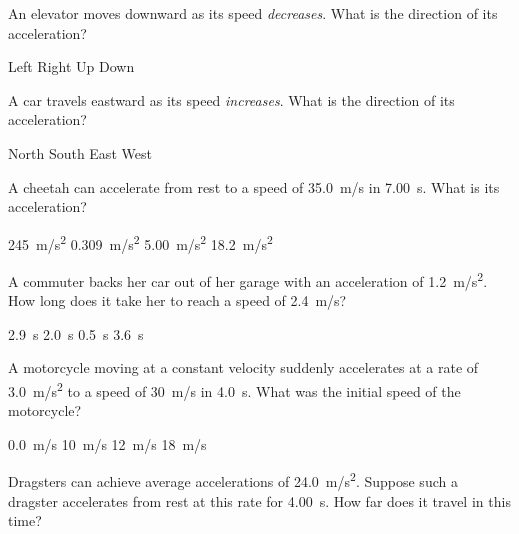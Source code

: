 \documentclass[]{exam}
\theoremstyle{definition}
\begin{document}
\begin{questions}
\question %
An elevator moves downward as its speed \textit{decreases}. What is the direction of its acceleration?

\begin{choices}
\choice Left
\choice Right 
\correctchoice Up
\choice Down
\end{choices}

\question %
A car travels eastward as its speed \textit{increases}. What is the direction of its acceleration?

\begin{choices}
\choice North
\choice South 
\correctchoice East
\choice West
\end{choices}


\question %
A cheetah can accelerate from rest to a speed of \SI{35.0}{m/s} in \SI{7.00}{s}. What is its acceleration?

\begin{choices}
\choice \SI{245}{m/s^2}
\choice \SI{0.309}{m/s^2}
\CorrectChoice \SI{5.00}{m/s^2}
\choice \SI{18.2}{m/s^2}
\end{choices}

\question %
A commuter backs her car out of her garage with an acceleration of \SI{1.2}{m/s^2}. How long does it take her to reach a speed of \SI{2.4}{m/s}?

\begin{choices}
\choice \SI{2.9}{s}
\correctchoice \SI{2.0}{s}
\choice \SI{0.5}{s}
\choice \SI{3.6}{s}
\end{choices}



\question %

A motorcycle moving at a constant velocity suddenly accelerates at a rate of \SI{3.0}{m/s^2} to a speed of \SI{30}{m/s} in \SI{4.0}{s}. What was the initial speed of the motorcycle?

\begin{choices}
\choice \SI{0.0}{m/s}
\choice \SI{10}{m/s}
\choice \SI{12}{m/s}
\CorrectChoice \SI{18}{m/s}
\end{choices}

\question %
Dragsters can achieve average accelerations of \SI{24.0}{m/s^2}. Suppose such a dragster accelerates from rest at this rate for \SI{4.00}{s}. How far does it travel in this time?


\end{questions}
\end{document}
